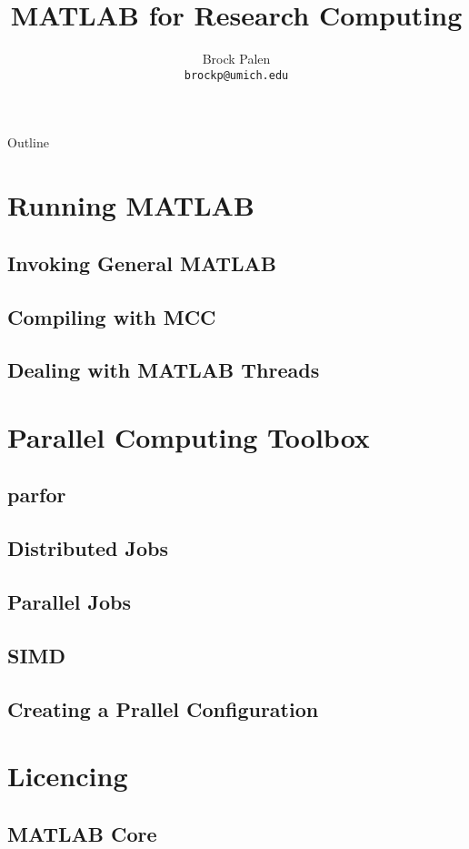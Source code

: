 \documentclass[handout]{beamer}
\title[MATLAB for Research Computing] {MATLAB for Research Computing}
\author{Brock Palen\\ \texttt{brockp@umich.edu}}
\begin{document}
  \begin{frame}
    \titlepage
  \end{frame}

  \begin{frame}{Outline}
    \tableofcontents
  \end{frame}
  
  \section{Running MATLAB}
   \subsection {Invoking General MATLAB}
   \subsection {Compiling with MCC}
   \subsection {Dealing with MATLAB Threads}
  \section{Parallel Computing Toolbox}
   \subsection{parfor}
   \subsection{Distributed Jobs}
   \subsection{Parallel Jobs}
   \subsection{SIMD}
   \subsection{Creating a Prallel Configuration}
  \section {Licencing}
   \subsection {MATLAB Core}
\end{document}

